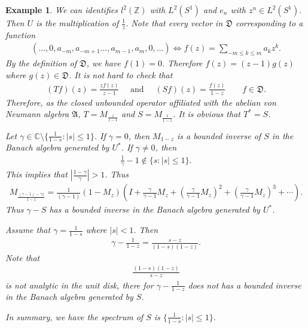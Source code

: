 \documentclass[a4paper,10pt]{amsart}
\newtheorem{example}{Example}[section]
\newcommand{\AAA}{\mathfrak A}
\newcommand{\DDD}{\mathfrak D}
\newcommand{\C}{\mathbb C} %
\newcommand{\Z}{\mathbb Z} %
\begin{document}
\begin{example}
We can identifies $l^{2}(\Z)$ with $L^{2}(S^{1})$ and 
$e_n$ with $z^{n} \in L^{2}(S^{1})$. Then $U$ is the multiplication of 
$\frac{1}{z}$. Note that every vector in $\DDD$ corresponding to a 
function 
\begin{align*}
    (\ldots, 0, a_{-m}, a_{-m+1} \ldots, a_{m-1}, a_{m}, 0, \ldots) 
    \Longleftrightarrow f(z) = \sum_{-m \leq k \leq m}a_k z^{k}.
\end{align*}
By the definition of $\DDD$, we have $f(1) = 0$. Therefore
$f(z) = (z-1)g(z)$ where $g(z) \in \DDD$. It is not hard to check that
\begin{align*}
 (Tf)(z) = \frac{zf(z)}{z-1} \quad \mbox{ and } \quad 
 (Sf)(z) = \frac{f(z)}{1-z} 
\qquad f \in \DDD.   
\end{align*}
Therefore, as the closed unbounded operator affiliated with the abelian
von Neumann algebra $\AAA$, $T = M_{\frac{z}{z-1}}$ and 
$S = M_{\frac{1}{1-z}}$. It is obvious that $T^{*} = S$.

Let $\gamma \in \C \setminus \{\frac{1}{1-s} : |s| \leq 1 \}$.
If $\gamma = 0$, then $M_{1-z}$ is a bounded inverse of $S$ in the
Banach algebra generated by $U^{*}$.
If $\gamma \neq 0$, then
\begin{align*}
    \frac{1}{\gamma} -1 \notin \{s : |s| \leq 1\}. 
\end{align*}
This implies that $|\frac{1-\gamma}{\gamma}| > 1$. Thus
\begin{align*}
    M_{\frac{(\gamma -1)-\gamma z}{1-z}} = 
    \frac{1}{(\gamma -1)}(1-M_{z})(I + \frac{\gamma}{\gamma-1}M_{z}
    + (\frac{\gamma}{\gamma-1}M_{z})^{2} 
    + (\frac{\gamma}{\gamma-1}M_{z})^{3}
    + \cdots). 
\end{align*}
Thus $\gamma - S$ has a bounded inverse in the Banach algebra generated
by $U^{*}$.

Assume that $\gamma = \frac{1}{1-s}$ where $|s| < 1$. Then
\begin{align*}
    \gamma - \frac{1}{1-z} = \frac{s-z}{(1-s)(1-z)}. 
\end{align*}
Note that
\begin{align*}
    \frac{(1-s)(1-z)}{s-z}
\end{align*}
is not analytic in the unit disk, there for $\gamma - \frac{1}{1-z}$ 
does not has a bounded inverse in the Banach algebra generated by $S$.

In summary, we have the spectrum of $S$ is $\{\frac{1}{1-s}: |s| \leq 1\}$. 

\end{example}
\end{document}
